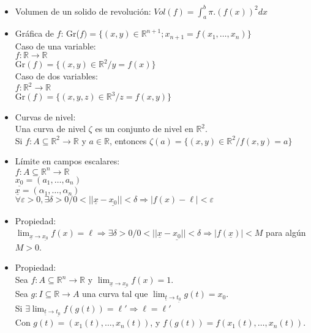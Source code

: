 \documentclass[a4paper, 12pt]{article}
\begin{document}
\begin{itemize}
\item Volumen de un solido de revolución:
$Vol(f)=\int_a^b \pi.(f(x))^2 dx$ \\

\newpage

\item Gráfica de $f$:
Gr($f)=\{(x,y) \in \mathbb{R}^{n+1} ; x_{n+1}= f(x_1, \dots, x_n)\}$\\
Caso de una variable: \\
$f:\mathbb{R} \to \mathbb{R}$ \\
Gr$(f)=\{(x,y) \in \mathbb{R}^2 / y = f(x)\}$\\
Caso de dos variables: \\
$f:\mathbb{R}^2 \to \mathbb{R}$ \\
Gr$(f)=\{(x,y,z) \in \mathbb{R}^3 / z = f(x,y)\}$\\
\item Curvas de nivel: \\
Una curva de nivel $\zeta$ es un conjunto de nivel en $\mathbb{R}^2$. \\
Si $f: A\subseteq \mathbb{R}^2 \to \mathbb{R}$ y $a \in \mathbb{R}$, entonces $\zeta(a) = \{(x,y) \in \mathbb{R}^2 / f(x,y)= a\}$\\

\item Límite en campos escalares: \\
 $f: A\subseteq \mathbb{R}^n \to \mathbb{R}$\\
$\underline{x_0}=(a_1,\dots,a_n)$\\
$\underline{x}=(\alpha_1,\dots,\alpha_n)$\\
$\forall \varepsilon > 0, \exists \delta > 0 / 0<||\underline{x} -\underline{x_0}|| < \delta \Longrightarrow |f(x) - \ell |< \varepsilon$

\item Propiedad: \\
$\displaystyle \lim_{\underline{x} \to \underline{x_0}} f(x)=\ell \Longrightarrow \exists \delta >0 / 0<||\underline{x} - \underline{x_0}||< \delta \Longrightarrow |f(\underline{x})|<M$ para algún $M>0$. \\

\item Propiedad: \\
Sea $f: A\subseteq \mathbb{R}^n \to \mathbb{R}$ y $\displaystyle \lim_{\underline{x} \to \underline{x_0}} f(x)=1$.\\
Sea $g:I\subseteq \mathbb{R} \to A$ una curva tal que $\displaystyle \lim_{\underline{t} \to \underline{t_0}} g(t) = x_0$.\\
Si $\displaystyle \exists \lim_{\underline{t} \to \underline{t_0}} f(g(t))=\ell' \Rightarrow \ell=\ell'$\\
Con $g(t)=(x_1(t),\dots,x_n(t))$, y $f(g(t))=f(x_1(t),\dots,x_n(t))$.\\ 


\end{itemize}
\end{document}
